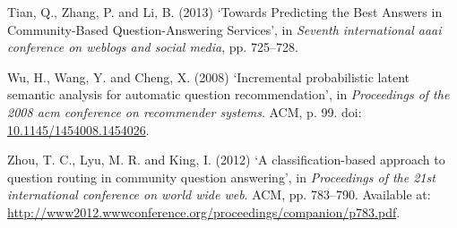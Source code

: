 \documentclass[12pt,preprint, authoryear]{article}
\numberwithin{equation}{section}
\numberwithin{figure}{section}
\numberwithin{table}{section}
\begin{document}
\hypertarget{ref-Tian2013}{}
Tian, Q., Zhang, P. and Li, B. (2013) `Towards Predicting the Best
Answers in Community-Based Question-Answering Services', in
\emph{Seventh international aaai conference on weblogs and social
media}, pp. 725--728.

\hypertarget{ref-Wu2008}{}
Wu, H., Wang, Y. and Cheng, X. (2008) `Incremental probabilistic latent
semantic analysis for automatic question recommendation', in
\emph{Proceedings of the 2008 acm conference on recommender systems}.
ACM, p. 99. doi:
\href{https://doi.org/10.1145/1454008.1454026}{10.1145/1454008.1454026}.

\hypertarget{ref-Zhou2012}{}
Zhou, T. C., Lyu, M. R. and King, I. (2012) `A classification-based
approach to question routing in community question answering', in
\emph{Proceedings of the 21st international conference on world wide
web}. ACM, pp. 783--790. Available at:
\url{http://www2012.wwwconference.org/proceedings/companion/p783.pdf}.

\newcommand\wordcount{
    \immediate\write18{texcount -sub=section \jobname.tex  | grep "Section" |     sed -e 's/+.*//' | sed -n \thesection p > 'count.txt'}
(words)}
\end{document}
